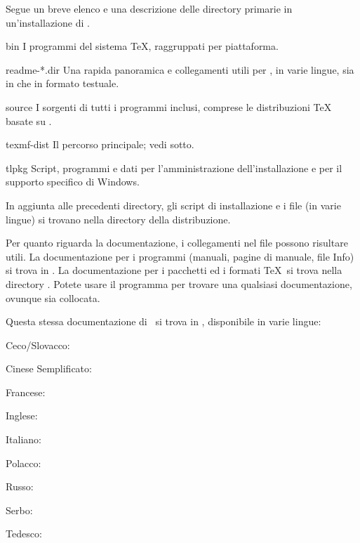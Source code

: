 \documentclass{article}
\begin{document}
Segue un breve elenco e una descrizione delle directory primarie in
un'installazione di \TL.

\begin{ttdescription}
\item[bin] I programmi del sistema \TeX{}, raggruppati per piattaforma.
%
\item[readme-*.dir] Una rapida panoramica e collegamenti utili per \TL{},
  in varie lingue, sia in \HTML{} che in formato testuale.
%
\item[source] I sorgenti di tutti i programmi inclusi, comprese le
  distribuzioni \TeX{} basate su \Webc{}.
%
\item[texmf-dist] Il percorso principale; vedi  sotto.
%
\item[tlpkg] Script, programmi e dati per l'amministrazione
  dell'installazione e per il supporto specifico di Windows.
\end{ttdescription}

In aggiunta alle precedenti directory, gli script di installazione e i
file  (in varie lingue) si trovano nella directory della
distribuzione.

Per quanto riguarda la documentazione, i collegamenti nel file
 possono risultare utili. La documentazione per i programmi
(manuali, pagine di manuale, file Info) si trova in .
La documentazione per i pacchetti ed i formati \TeX\ si trova nella
directory . Potete usare il programma
 per trovare una qualsiasi documentazione, ovunque sia
collocata.

Questa stessa documentazione di \TL\ si trova in
, disponibile in varie lingue:

\begin{itemize*}
\item{Ceco/Slovacco:} 
\item{Cinese Semplificato:} 
\item{Francese:} 
\item{Inglese:} 
\item{Italiano:} 
\item{Polacco:} 
\item{Russo:} 
\item{Serbo:} 
\item{Tedesco:} 
\end{itemize*}
\end{document}
